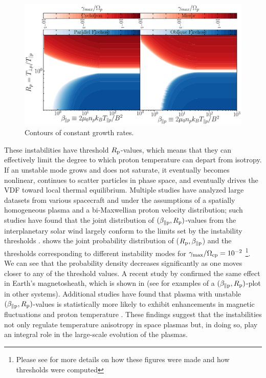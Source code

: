         \begin{figure}
            \begin{center}
                \includegraphics[width=1\textwidth]{figures/chap2/growth_rate_contours.pdf}
                \caption[$\gamma$ Contours]{Contours of constant growth rates.}
                \label{fig:gamma_cntr}
            \end{center}
        \end{figure}

        These instabilities have threshold $R_{\rm p}$-values, which means that they can effectively
        limit the degree to which proton temperature can depart from isotropy. If an unstable mode
        grows and does not saturate, it eventually becomes nonlinear, continues to scatter particles
        in phase space, and eventually drives the VDF toward local thermal equilibrium. Multiple
        studies have analyzed large datasets from various spacecraft and under the assumptions of a
        spatially homogeneous plasma and a bi-Maxwellian proton velocity distribution; such studies
        have found that the joint distribution of $(\beta_{\parallel \rm p},R_{\rm p})$-values from
        the interplanetary solar wind largely conform to the limits set by the instability
        thresholds \citep{Gary2001,Kasper2002,Hellinger2006,Matteini2007}.
         shows the joint probability distribution of ($R_{\rm p},
        \beta_{\parallel \rm p}$) and the thresholds corresponding to different instability modes
        for $\gamma_{\max}/\Omega_{\rm cp} = 10^{-2}$ \footnote{Please see  for more
        details on how these figures were made and how thresholds were computed}. We can see that
        the probability density decreases significantly as one moves closer to any of the threshold
        values. A recent study by \citet{Maruca2018} confirmed the same effect in Earth's
        magnetosheath, which is shown in  (see  for examples
        of a $(\beta_{\parallel \rm p},R_{\rm p})$-plot in other systems). Additional studies have
        found that plasma with unstable $(\beta_{\parallel \rm p},R_{\rm p})$-values is
        statistically more likely to exhibit enhancements in magnetic fluctuations \citep{Bale2009}
        and proton temperature \citep{Maruca2011}. These findings suggest that the instabilities not
        only regulate temperature anisotropy in space plasmas but, in doing so, play an integral
        role in the large-scale evolution of the plasmas.

